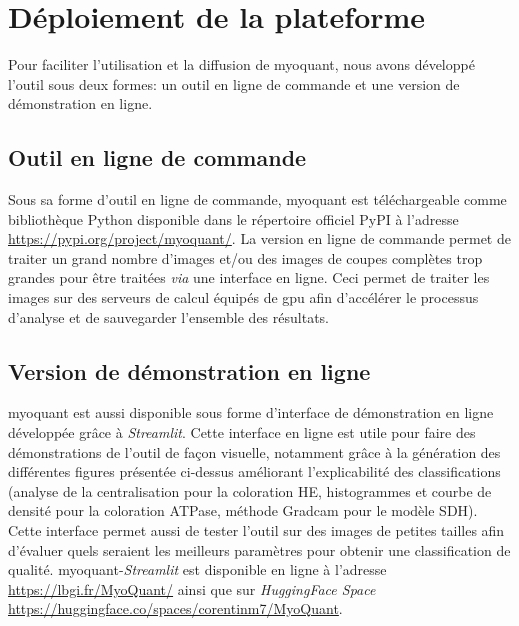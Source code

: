 \clearpage
\section{Déploiement de la plateforme}
Pour faciliter l'utilisation et la diffusion de \gls{myoquant}, nous avons développé l'outil sous deux formes: un outil en ligne de commande et une version de démonstration en ligne.

\subsection{Outil en ligne de commande}
Sous sa forme d'outil en ligne de commande, \gls{myoquant} est téléchargeable comme bibliothèque Python disponible dans le répertoire officiel PyPI à l'adresse \href{https://pypi.org/project/myoquant/}{https://pypi.org/project/myoquant/}. La version en ligne de commande permet de traiter un grand nombre d'images et/ou des images de coupes complètes trop grandes pour être traitées \textit{via} une interface en ligne. Ceci permet de traiter les images sur des serveurs de calcul équipés de \gls{gpu} afin d'accélérer le processus d'analyse et de sauvegarder l'ensemble des résultats.

\subsection{Version de démonstration en ligne}
\gls{myoquant} est aussi disponible sous forme d'interface de démonstration en ligne développée grâce à \textit{Streamlit}. Cette interface en ligne est utile pour faire des démonstrations de l'outil de façon visuelle, notamment grâce à la génération des différentes figures présentée ci-dessus améliorant l'explicabilité des classifications (analyse de la centralisation pour la coloration HE, histogrammes et courbe de densité pour la coloration ATPase, méthode Gradcam pour le modèle SDH). Cette interface permet aussi de tester l'outil sur des images de petites tailles afin d'évaluer quels seraient les meilleurs paramètres pour obtenir une classification de qualité. \gls{myoquant}-\textit{Streamlit} est disponible en ligne à l'adresse \href{https://lbgi.fr/MyoQuant/}{https://lbgi.fr/MyoQuant/} ainsi que sur \textit{HuggingFace Space} \href{https://huggingface.co/spaces/corentinm7/MyoQuant}{https://huggingface.co/spaces/corentinm7/MyoQuant}.


